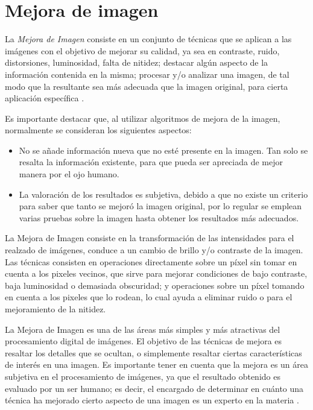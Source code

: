 \section{Mejora de imagen}

La \textit {Mejora de Imagen} consiste en un conjunto de técnicas que se aplican a las imágenes con el objetivo de mejorar su calidad, ya sea en contraste, ruido, distorsiones, luminosidad, falta de nitidez; destacar algún aspecto de la información contenida en la misma; procesar y/o analizar una imagen, de tal modo que la resultante sea más adecuada que la imagen original, para cierta aplicación específica \cite{gonzales1996procesamiento}.

Es importante destacar que, al utilizar algoritmos de mejora de la imagen, normalmente se consideran los siguientes aspectos:

\begin{itemize}
  \item No se añade información nueva que no esté presente en la imagen. Tan solo se resalta la información existente, para que pueda ser apreciada de mejor manera por el ojo humano.
  \item La valoración de los resultados es subjetiva, debido a que no existe un criterio para saber que tanto se mejoró la imagen original, por lo regular se emplean varias pruebas sobre la imagen hasta obtener los resultados más adecuados.
\end{itemize}

La Mejora de Imagen consiste en la transformación de las intensidades para el realzado de imágenes, conduce a un cambio de brillo y/o contraste de la imagen. Las técnicas consisten en operaciones directamente sobre un píxel sin tomar en cuenta a los pixeles vecinos, que sirve para mejorar condiciones de bajo contraste, baja luminosidad o demasiada obscuridad; y operaciones sobre un píxel tomando en cuenta a los pixeles que lo rodean, lo cual ayuda a eliminar ruido o para el mejoramiento de la nitidez.

La Mejora de Imagen es una de las áreas más simples y más atractivas del procesamiento digital de imágenes. El objetivo de las técnicas de mejora es resaltar los detalles que se ocultan, o simplemente resaltar ciertas características de interés en una imagen. Es importante tener en cuenta que la mejora es un área subjetiva en el procesamiento de imágenes, ya que el resultado obtenido es evaluado por un ser humano; es decir, el encargado de determinar en cuánto una técnica ha mejorado cierto aspecto de una imagen es un experto en la materia \cite{handbook2000}.

